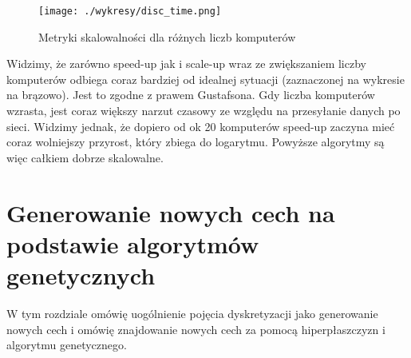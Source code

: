 \documentclass[magisterska]{pracamgr}
\theoremstyle{plain}
\theoremstyle{definition}
\theoremstyle{remark}
\begin{document}
\begin{figure}
 \caption{Metryki skalowalności dla różnych liczb komputerów}
 \centering\texttt{[image: ./wykresy/disc\_time.png]}
\end{figure}

Widzimy, że zarówno speed-up jak i scale-up wraz ze zwiększaniem liczby komputerów odbiega coraz bardziej od idealnej sytuacji 
(zaznaczonej na wykresie na brązowo). Jest to zgodne z prawem Gustafsona. Gdy liczba komputerów wzrasta, jest coraz większy narzut czasowy
ze względu na przesyłanie danych po sieci. Widzimy jednak, że dopiero od ok 20 komputerów speed-up zaczyna mieć coraz wolniejszy przyrost,
który zbiega do logarytmu. Powyższe algorytmy są więc całkiem dobrze skalowalne.



\chapter{Generowanie nowych cech na podstawie algorytmów genetycznych}

W tym rozdziale omówię uogólnienie pojęcia dyskretyzacji jako generowanie nowych cech i omówię
znajdowanie nowych cech za pomocą hiperpłaszczyzn i algorytmu genetycznego.
\end{document}
